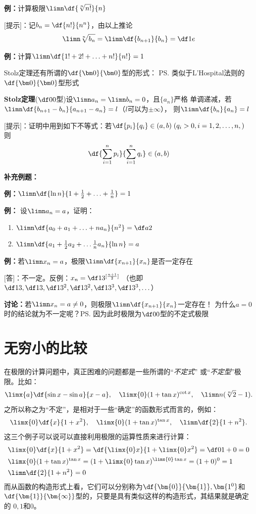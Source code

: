 {\bf 例：}计算极限$\limn\df{\sqrt[n]{n!}}{n}$

[提示]：记$b_n=\df{n!}{n^n}$，由以上推论
$$\limn\sqrt[n]{b_n}=\limn\df{b_{n+1}}{b_n}=\df1e$$

{\bf 例：}计算$\limn\df{1!+2!+\ldots+n!}{n!}=1$

Stolz定理还有所谓的$\df{\bm0}{\bm0}$型的形式：
\ps{类似于L'Hospital法则的$\df{\bm0}{\bm0}$型形式}

\begin{thx}
	{\bf Stolz定理}($\df00$型)设$\limn a_n=\limn b_n=0$，且$\{a_n\}$严格
	单调递减，若$\limn\df{b_{n+1}-b_n}{a_{n+1}-a_n}=l$（$l$可以为$\pm\infty$），
	则$\limn\df{b_n}{a_n}=l$
\end{thx}

[提示]：证明中用到如下不等式：若$\df{p_i}{q_i}\in(a,b)\;(q_i>0,i=1,2,\ldots,n,)$
则
$$\df{\sum\limits_{i=1}^np_i}{\sum\limits_{i=1}^nq_i}\in(a,b)$$

{\bf 补充例题：}


{\bf 例：}$\limn\df{\ln n}{1+\frac12+\ldots+\frac1n}=1$

{\bf 例：} 设$\limn a_n=a$，证明：
\begin{enumerate}[(1)]
  \setlength{\itemindent}{1cm}
  \item $\limn\df{a_0+a_1+\ldots+na_n}{n^2}=\df a2$
  \item $\limn\df{a_1+\frac12a_2+\ldots\frac1na_n}{\ln n}=a$
\end{enumerate}

{\bf 例：}若$\limn x_n=a$，极限$\limn\df{x_{n+1}}{x_n}$是否一定存在

[答]：不一定。反例：$x_n=\df1{3^{[\frac{n+1}2]}}$ （也即
$\df13, \df13, \df 1{3^2}, \df1{3^2}, \df1{3^3}, \df1{3^3},\ldots$）

{\bf 讨论：}若$\limn x_n=a\ne 0$，则极限$\limn\df{x_{n+1}}{x_n}$一定存在！
为什么$a=0$时的结论就为不一定呢？\ps{因为此时极限为$\df00$型的不定式极限}

\section{无穷小的比较}

在极限的计算问题中，真正困难的问题都是一些所谓的“{\it 不定式}”
或“{\it 不定型}”极限。比如：
$$\limx{a}\df{\sin x-\sin a}{x-a},\quad \limx{0}(1+\tan x)^{\cot x},
\quad \limn n(\sqrt[n]2-1).$$
之所以称之为“不定”，是相对于一些“确定”的函数形式而言的，例如：
$$\limx{0}\df{x}{1+x^2},\quad \limx{0}(1+\tan x)^{\tan x},
\quad \limn\df{2}{1+n^2}.$$
这三个例子可以说可以直接利用极限的运算性质来进行计算：
\begin{align*}
	&\limx{0}\df{x}{1+x^2}=\df{\limx{0} x}{1+\limx{0}x^2}=\df0{1+0}=0\\
	&\limx{0}(1+\tan x)^{\tan x}=(1+\limx{0}\tan x)^{\limx{0}\tan x}
	=(1+0)^0=1\\
	&\limn\df{2}{1+n^2}=0
\end{align*}
而从函数的构造形式上看，它们可以分别称为$\df{\bm{0}}{\bm{1}},\bm{1^0}$和
$\df{\bm{1}}{\bm{\infty}}$型的，只要是具有类似这样的构造形式，其结果就是确定的
$0,1$和$0$。

